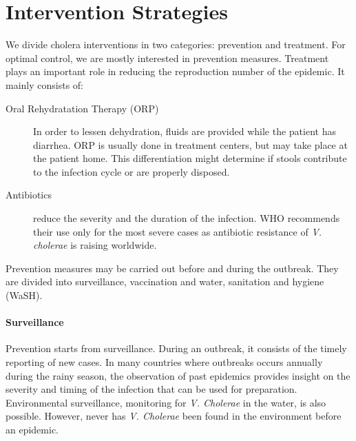\section{Intervention Strategies} 
We divide cholera interventions in two categories: prevention and treatment. For optimal control, we are mostly interested in prevention measures. Treatment plays an important role in reducing the reproduction number of the epidemic. It mainly consists of:
\begin{description}
\item[Oral Rehydratation Therapy (ORP)] In order to lessen dehydration, fluids are provided while the patient has diarrhea. ORP is usually done in treatment centers, but may take place at the patient home. This differentiation might determine if stools contribute to the infection cycle or are properly disposed.
\item[Antibiotics] reduce the severity and the duration of the infection. WHO recommends their use only for the most severe cases as antibiotic resistance of \emph{V. cholerae} is raising worldwide\cite{Sack:GettingSeriousCholera:2006}.
\end{description}

Prevention measures may be carried out before and during the outbreak. They are divided into surveillance, vaccination and water, sanitation and hygiene (WaSH).

\paragraph{Surveillance} Prevention starts from surveillance. During an outbreak, it consists of the timely reporting of new cases. In many countries where outbreaks occurs annually during the rainy season, the observation of past epidemics provides insight on the severity and timing of the infection that can be used for preparation\cite{Baracchini:SeasonalityCholeraDynamics:2017}. Environmental surveillance, monitoring for \textit{V. Cholerae} in the water, is also possible. However, never has \textit{V. Cholerae} been found in the environment before an epidemic.


